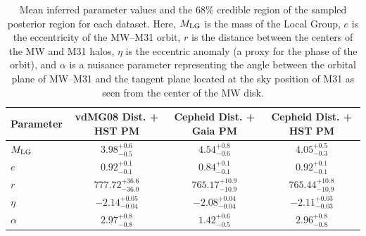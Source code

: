 \documentclass[twocolumn]{aastex631}
\newcommand{\mlg}{\ensuremath{M_{\rm LG}}}
\begin{document}
\begin{table}
  \begin{tabular}{lc|c|c}
    \hline\hline
    Parameter  & \textbf{vdMG08 Dist. + HST PM} & \textbf{Cepheid Dist. + Gaia PM} & \textbf{Cepheid Dist. + HST PM}\\\hline
    $\mlg$ & $3.98^{+0.6}_{-0.5}$ & $4.54^{+0.8}_{-0.6} $ & $4.05^{+0.5}_{-0.3} $ \\
    $e$ & $0.92^{+0.1}_{-0.1}$ & $0.84^{+0.1}_{-0.1}$ & $0.92^{+0.1}_{-0.1} $ \\
    $r$ & $777.72^{+36.6}_{-36.0}$ & $765.17^{+10.9}_{-10.9}$ & $765.44^{+10.8}_{-10.9} $ \\
    $\eta$ & $-2.14^{+0.05}_{-0.04}$ & $-2.08^{+0.04}_{-0.04}$ & $-2.11^{+0.03}_{-0.03} $\\
    $\alpha$ & $2.97^{+0.8}_{-0.8}$ & $1.42^{+0.6}_{-0.5} $ &  $2.96^{+0.8}_{-0.8} $ \\
  \hline\hline
  \end{tabular}
  \caption{\label{table:convergedparams}Mean inferred parameter values and the
  68\% credible region of the sampled posterior region for each dataset.
  Here, $\mlg$ is the mass of the Local Group, $e$ is the eccentricity of the
  MW--M31 orbit, $r$ is the distance between the centers of the MW and M31
  halos, $\eta$ is the eccentric anomaly (a proxy for the phase of the orbit),
  and $\alpha$ is a nuisance parameter representing the angle between the
  orbital plane of MW--M31 and the tangent plane located at the sky position of
  M31 as seen from the center of the MW disk.}
\end{table}
\end{document}
